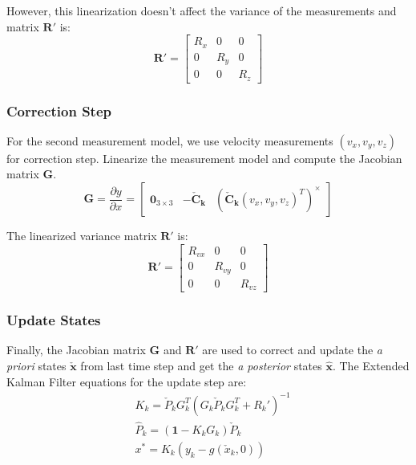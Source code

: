 \documentclass[letterpaper, 10 pt, conference]{ieeeconf}  %
\newcommand{\rom}[1]{\uppercase\expandafter{\romannumeral #1\relax}}
\begin{document}
However, this linearization doesn't affect the variance of the measurements and matrix $\bm{R'}$ is:
\begin{equation}
\renewcommand\arraystretch{1.3}
\bm{R'}=\begin{bmatrix}
R_{x}  & 0   & 0 \\
0  & R_{y}   & 0 \\
0  & 0   & R_{z} 
\end{bmatrix}
\end{equation}

\subsubsection{Correction Step \rom{2}}
For the second measurement model, we use velocity measurements $(v_x,v_y,v_z)$ for correction step. Linearize the measurement model and compute the Jacobian matrix $\bm{G}$.
\begin{equation}
\bm{G}=\frac{\partial y}{\partial x}=\begin{bmatrix}
\bm{0}_{3\times 3} & -\bm{\check{C}_k}  &(\bm{\check{C}_k}(v_x,v_y,v_z)^T)^{\times} 
\end{bmatrix}
\end{equation} 

The linearized variance matrix $\bm{R'}$ is:
\begin{equation}
\renewcommand\arraystretch{1.3}
\bm{R'}=\begin{bmatrix}
R_{vx}  & 0   & 0 \\
0  & R_{vy}   & 0 \\
0  & 0   & R_{vz} 
\end{bmatrix}
\end{equation}
\subsubsection{Update States}
Finally, the Jacobian matrix $\bm{G}$ and $\bm{R'}$ are used to correct and update the \textit{a priori} states $\bm{\check{x}}$ from last time step and get the \textit{a posterior} states $\bm{\hat{x}}$. The Extended Kalman Filter equations for the update step are:
\begin{equation}
\renewcommand\arraystretch{1.3}
\begin{split}
&K_k = \check{P}_k G_k^T\left(G_k\check{P}_k G_k^T + R_k'\right)^{-1}   \\
&\hat{P}_k  = (\bm{1}-K_k G_k)\check{P}_k  \\
&x^{\ast} = K_k(y_k-g(\check{x}_k,0)) 
\end{split}
\end{equation}
\end{document}
